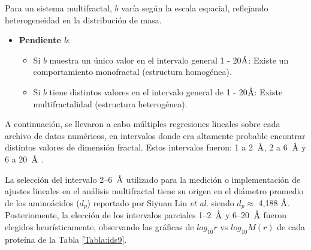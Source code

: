 	Para un sistema multifractal, $b$ var\'{i}a seg\'{u}n la escala espacial, reflejando heterogeneidad en la distribuci\'{o}n de masa.
	\begin{itemize}
		\item \textbf{Pendiente $b$}:
		\begin{itemize}
			\item Si $b$ muestra un \'{u}nico valor en el intervalo general 1 - 20$\textup{\r{A}}$: Existe un comportamiento monofractal (estructura homog\'{e}nea).
			\item Si $b$  tiene distintos valores en el intervalo general de 1 - 20$\textup{\r{A}}$: Existe multifractalidad (estructura heterog\'{e}nea).
		\end{itemize}
	\end{itemize}
	
	A continuaci\'{o}n, se llevaron a cabo m\'{u}ltiples regresiones lineales sobre cada archivo de datos num\'{e}ricos, en intervalos donde era altamente probable encontrar distintos valores de dimensi\'{o}n fractal. Estos intervalos fueron: 1 a 2~$\textup{\r{A}}$, 2 a 6~$\textup{\r{A}}$ y 6 a 20~$\textup{\r{A}}$ \cite{Enright2005, Liu2020}.	
	
	
	
	La selecci\'on del intervalo 2--6~$\textup{\r{A}}$ utilizado para la medici\'on o implementaci\'on de ajustes lineales en el an\'alisis multifractal tiene su origen en el di\'ametro promedio de los amino\'acidos ($d_p$) reportado por Siyuan Liu \textit{et al.}  siendo $d_p \approx$ 4,188 $\textup{\r{A}}$. Posteriomente, la elecci\'{o}n de los intervalos parciales 1--2~$\textup{\r{A}}$ y 6--20~$\textup{\r{A}}$ fueron elegidos heur\'{i}sticamente, observando las gr\'{a}ficas de $log_{10}r$ vs $log_{10}M(r)$ de cada prote\'{i}na de la Tabla \ref{Tabla:ids9}.
	
